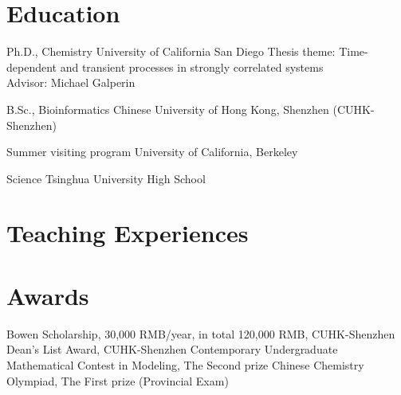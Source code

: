 \documentclass[letterpaper,11pt]{moderncv}
\begin{document}
\maketitle


\section{Education}
{Ph.D., Chemistry}
{University of California San Diego}{}{}
{Thesis theme: Time-dependent and transient processes in strongly correlated 
systems\\ 
Advisor: Michael Galperin}

{B.Sc., Bioinformatics}
{Chinese University of Hong Kong, Shenzhen (CUHK-Shenzhen)}{}{}{}

{Summer visiting program}
{University of California, Berkeley} {}{}{}

{Science}
{Tsinghua University High School}{}{}{}


\nocite{*}
\printbibliography[title=Publications]


\section{Teaching Experiences}

\section{Awards}
{Bowen Scholarship, 30,000 RMB/year, in total 120,000 RMB, CUHK-Shenzhen}
{Dean's List Award, CUHK-Shenzhen}
{Contemporary Undergraduate Mathematical Contest in Modeling, The Second prize}
{Chinese Chemistry Olympiad, The First prize (Provincial Exam)}
\end{document}
